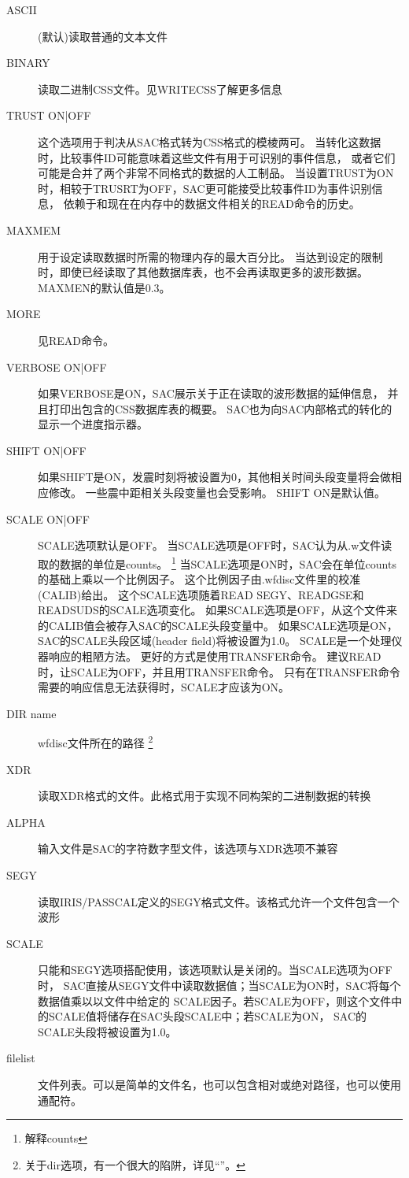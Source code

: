 \begin{description}
\item [ASCII] (默认)读取普通的文本文件
\item [BINARY] 读取二进制CSS文件。见WRITECSS了解更多信息
\item [TRUST ON|OFF] 这个选项用于判决从SAC格式转为CSS格式的模棱两可。
    当转化这数据时，比较事件ID可能意味着这些文件有用于可识别的事件信息，
    或者它们可能是合并了两个非常不同格式的数据的人工制品。
    当设置TRUST为ON时，相较于TRUSRT为OFF，SAC更可能接受比较事件ID为事件识别信息，
    依赖于和现在在内存中的数据文件相关的READ命令的历史。%
\item [MAXMEM]用于设定读取数据时所需的物理内存的最大百分比。
    当达到设定的限制时，即使已经读取了其他数据库表，也不会再读取更多的波形数据。
    MAXMEN的默认值是0.3。
\item [MORE] 见READ命令。
\item [VERBOSE ON|OFF] 如果VERBOSE是ON，SAC展示关于正在读取的波形数据的延伸信息，
    并且打印出包含的CSS数据库表的概要。
    SAC也为向SAC内部格式的转化的显示一个进度指示器。
\item [SHIFT ON|OFF] 如果SHIFT是ON，发震时刻将被设置为0，其他相关时间头段变量将会做相应修改。
    一些震中距相关头段变量也会受影响。
    SHIFT ON是默认值。
\item [SCALE ON|OFF] SCALE选项默认是OFF。
    当SCALE选项是OFF时，SAC认为从.w文件读取的数据的单位是counts。
    \footnote{解释counts}
    当SCALE选项是ON时，SAC会在单位counts的基础上乘以一个比例因子。
    这个比例因子由.wfdisc文件里的校准(CALIB)给出。
    这个SCALE选项随着READ SEGY、READGSE和READSUDS的SCALE选项变化。
    如果SCALE选项是OFF，从这个文件来的CALIB值会被存入SAC的SCALE头段变量中。
    如果SCALE选项是ON，SAC的SCALE头段区域(header field)将被设置为1.0。
    SCALE是一个处理仪器响应的粗陋方法。
    更好的方式是使用TRANSFER命令。
    建议READ时，让SCALE为OFF，并且用TRANSFER命令。
    只有在TRANSFER命令需要的响应信息无法获得时，SCALE才应该为ON。





\item [DIR name] wfdisc文件所在的路径
    \footnote{关于dir选项，有一个很大的陷阱，详见``''。}
\item [XDR] 读取XDR格式的文件。此格式用于实现不同构架的二进制数据的转换
\item [ALPHA] 输入文件是SAC的字符数字型文件，该选项与XDR选项不兼容
\item [SEGY] 读取IRIS/PASSCAL定义的SEGY格式文件。该格式允许一个文件包含一个波形
\item [SCALE] 只能和SEGY选项搭配使用，该选项默认是关闭的。当SCALE选项为OFF时，
    SAC直接从SEGY文件中读取数据值；当SCALE为ON时，SAC将每个数据值乘以以文件中给定的
    SCALE因子。若SCALE为OFF，则这个文件中的SCALE值将储存在SAC头段SCALE中；若SCALE为ON，
    SAC的SCALE头段将被设置为1.0。
\item [filelist] 文件列表。可以是简单的文件名，也可以包含相对或绝对路径，也可以使用
    通配符。
\end{description}

